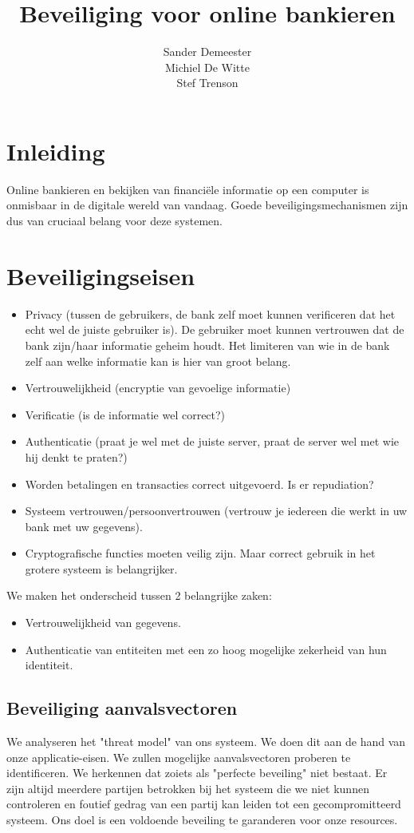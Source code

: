 \documentclass[11pt]{article}
\title{\textbf{Beveiliging voor online bankieren}}
\author{Sander Demeester\\
		Michiel De Witte\\
		Stef Trenson}
\date{}
\begin{document}
\maketitle

\section{Inleiding}
Online bankieren en bekijken van financi\"ele informatie op een computer is onmisbaar in de digitale wereld van vandaag. Goede beveiligingsmechanismen zijn dus van cruciaal belang voor deze systemen. 

\section{Beveiligingseisen}
\label{sec:bev_eis}
\begin{itemize}
\item Privacy (tussen de gebruikers, de bank zelf moet kunnen verificeren dat het echt wel de juiste gebruiker is). De gebruiker moet kunnen vertrouwen dat de bank zijn/haar informatie geheim houdt. Het limiteren van wie in de bank zelf aan welke informatie kan is hier van groot belang.
\item Vertrouwelijkheid (encryptie van gevoelige informatie)
\item Verificatie (is de informatie wel correct?)
\item Authenticatie (praat je wel met de juiste server, praat de server wel met wie hij denkt te praten?)
\item Worden betalingen en transacties correct uitgevoerd. Is er repudiation?
\item Systeem vertrouwen/persoonvertrouwen (vertrouw je iedereen die werkt in uw bank met uw gegevens). 
\item Cryptografische functies moeten veilig zijn. Maar correct gebruik in het grotere systeem is belangrijker.
\end{itemize}
We maken het onderscheid tussen 2 belangrijke zaken: 
\begin{itemize}
\item Vertrouwelijkheid van gegevens.
\item Authenticatie van entiteiten met een zo hoog mogelijke zekerheid van hun identiteit. 
\end{itemize}
\subsection{Beveiliging aanvalsvectoren}
We analyseren het "threat model" van ons systeem. We doen dit aan de hand van onze applicatie-eisen. We zullen mogelijke aanvalsvectoren proberen te identificeren. We herkennen dat zoiets als "perfecte beveiling" niet bestaat. Er zijn altijd meerdere partijen betrokken bij het systeem die we niet kunnen controleren en foutief gedrag van een partij kan leiden tot een gecompromitteerd systeem. Ons doel is een voldoende beveiling te garanderen voor onze resources.
\end{document}
